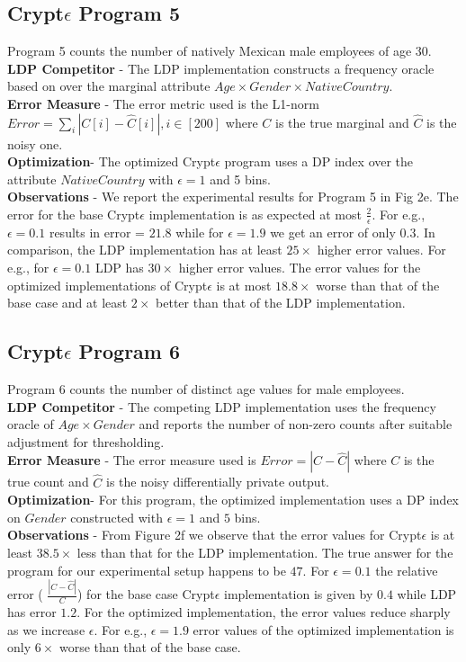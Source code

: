 \subsection*{Crypt$\epsilon$ Program 5}
Program 5 counts the number of natively Mexican male employees of age 30.
\\\textbf{\textsf{LDP} Competitor} -  The  \textsf{LDP} implementation constructs a frequency oracle based on \cite{LDP1} over the marginal attribute $Age\times Gender\times NativeCountry$. 
\\\textbf{Error Measure} - The error metric used is  the L1-norm  $ Error=\sum_{i}|C[i]-\hat{C}[i]|, i \in [200]$ where $C$ is the true marginal and $\hat{C}$ is the noisy one. \\\textbf{Optimization}- The optimized Crypt$\epsilon$ program uses a DP index over the attribute $NativeCountry$ with $\epsilon=1$ and 5 bins.
\\\textbf{Observations} - We report the experimental results for Program 5  in Fig 2e. The error for the base Crypt$\epsilon$ implementation is as expected at most $\frac{2}{\epsilon}$. For e.g., $\epsilon=0.1$ results in error = $21.8$ while for $\epsilon=1.9$ we get an error of only $0.3$. In comparison, the \textsf{LDP} implementation has  at least $25 \times$ higher error values. For e.g., for $\epsilon=0.1$ \textsf{LDP} has $30 \times$ higher error values. The error values for the optimized implementations of Crypt$\epsilon$  is at most $18.8 \times$ worse than that of the base case and at least $2\times$ better than that of the \textsf{LDP} implementation.
\subsection*{Crypt$\epsilon$ Program 6}
Program 6 counts the number of distinct age values for male employees.  
\\\textbf{\textsf{LDP} Competitor} - The competing \textsf{LDP} implementation uses the frequency oracle of \cite{LDP1} $Age\times Gender$ and reports the number of non-zero counts after suitable adjustment for thresholding. 
\\\textbf{Error Measure} - The error measure used is  $Error = |C-\hat{C}|$ where $C$ is the true count and $\hat{C}$ is the noisy differentially private output. \\
\textbf{Optimization}- For this program, the optimized implementation uses a DP index on $Gender$ constructed with $\epsilon=1$ and $5$ bins.
\\\textbf{Observations} - From Figure 2f we observe that the error values for Crypt$\epsilon$ is at least $38.5 \times$ less than that for the \textsf{LDP} implementation. The true answer for the program for our experimental setup happens to be $47$. For $\epsilon=0.1$ the relative error ( $\frac{|C-\hat{C}|}{C}$) for the base case Crypt$\epsilon$ implementation is given by  $0.4$ while \textsf{LDP} has error $1.2$. For the optimized implementation, the error values reduce sharply as we increase $\epsilon$. For e.g., $\epsilon=1.9$ error values of the optimized implementation is only $6\times$ worse than that of the base case. 

